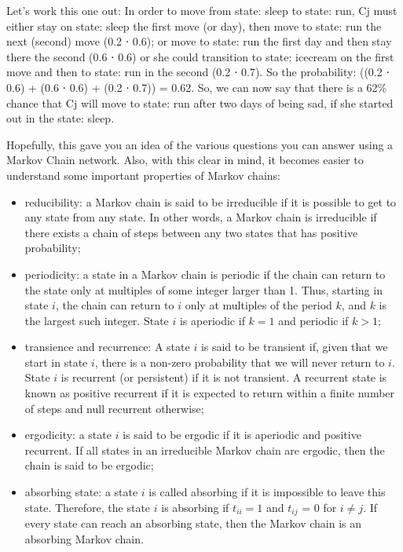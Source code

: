 Let's work this one out: In order to move from state: sleep to state: run, Cj must either stay on state: sleep the first move (or day), then move to state: run the next (second) move (0.2 ⋅ 0.6); or move to state: run the first day and then stay there the second (0.6 ⋅ 0.6) or she could transition to state: icecream on the first move and then to state: run in the second (0.2 ⋅ 0.7). So the probability: ((0.2 ⋅ 0.6) + (0.6 ⋅ 0.6) + (0.2 ⋅ 0.7)) = 0.62. So, we can now say that there is a 62\% chance that Cj will move to state: run after two days of being sad, if she started out in the state: sleep.

Hopefully, this gave you an idea of the various questions you can answer using a Markov Chain network.
Also, with this clear in mind, it becomes easier to understand some important properties of Markov chains:

\begin{itemize}
	\tightlist
	\item reducibility: a Markov chain is said to be irreducible if it is possible to get to any state from any state. In other words, a Markov chain is irreducible if there exists a chain of steps between any two states that has positive probability;
	\item periodicity: a state in a Markov chain is periodic if the chain can return to the state only at multiples of some integer larger than 1. Thus, starting in state $i$, the chain can return to $i$ only at multiples of the period $k$, and $k$ is the largest such integer. State $i$ is aperiodic if $k = 1$ and periodic if $k > 1$;	
	\item transience and recurrence: A state $i$ is said to be transient if, given that we start in state $i$, there is a non-zero probability that we will never return to $i$. State $i$ is recurrent (or persistent) if it is not transient. A recurrent state is known as positive recurrent if it is expected to return within a finite number of steps and null recurrent otherwise;
	\item ergodicity: a state $i$ is said to be ergodic if it is aperiodic and positive recurrent. If all states in an irreducible Markov chain are ergodic, then the chain is said to be ergodic;
	\item absorbing state: a state $i$ is called absorbing if it is impossible to leave this state. Therefore, the state $i$ is absorbing if $t_{ii} = 1$ and $t_{ij}$ = 0 for $i \neq j$. If every state can reach an absorbing state, then the Markov chain is an absorbing Markov chain.
\end{itemize}


